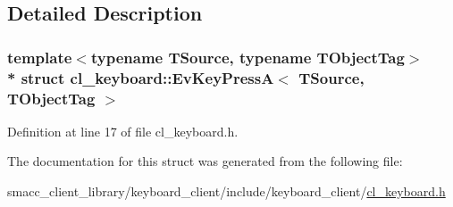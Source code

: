 \subsection{Detailed Description}
\subsubsection*{template$<$typename T\+Source, typename T\+Object\+Tag$>$\\*
struct cl\+\_\+keyboard\+::\+Ev\+Key\+Press\+A$<$ T\+Source, T\+Object\+Tag $>$}



Definition at line 17 of file cl\+\_\+keyboard.\+h.



The documentation for this struct was generated from the following file\+:\begin{DoxyCompactItemize}
\item 
smacc\+\_\+client\+\_\+library/keyboard\+\_\+client/include/keyboard\+\_\+client/\hyperlink{cl__keyboard_8h}{cl\+\_\+keyboard.\+h}\end{DoxyCompactItemize}
